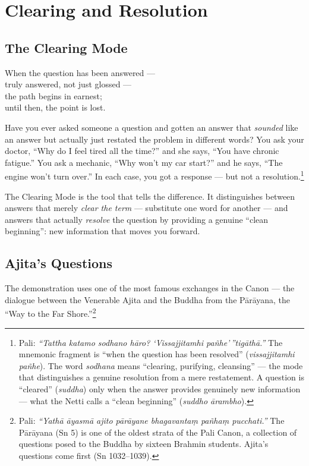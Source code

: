 \chapter{Clearing and Resolution}
\label{ch:clearing}

\section*{The Clearing Mode}

\begin{versebox}
When the question has been answered ---\\
truly answered, not just glossed ---\\
the path begins in earnest;\\
until then, the point is lost.
\end{versebox}

\noindent Have you ever asked someone a question and gotten an answer that \textit{sounded} like an answer but actually just restated the problem in different words? You ask your doctor, ``Why do I feel tired all the time?'' and she says, ``You have chronic fatigue.'' You ask a mechanic, ``Why won't my car start?'' and he says, ``The engine won't turn over.'' In each case, you got a response --- but not a resolution.\footnote{Pali: \textit{``Tattha katamo sodhano hāro? `Vissajjitamhi pañhe'\,''tigāthā.''} The mnemonic fragment is ``when the question has been resolved'' (\textit{vissajjitamhi pañhe}). The word \textit{sodhana} means ``clearing, purifying, cleansing'' --- the mode that distinguishes a genuine resolution from a mere restatement. A question is ``cleared'' (\textit{suddha}) only when the answer provides genuinely new information --- what the Netti calls a ``clean beginning'' (\textit{suddho ārambho}).}

The Clearing Mode is the tool that tells the difference. It distinguishes between answers that merely \textit{clear the term} --- substitute one word for another --- and answers that actually \textit{resolve} the question by providing a genuine ``clean beginning'': new information that moves you forward.

\section*{Ajita's Questions}

The demonstration uses one of the most famous exchanges in the Canon --- the dialogue between the Venerable Ajita and the Buddha from the Pārāyana, the ``Way to the Far Shore.''\footnote{Pali: \textit{``Yathā āyasmā ajito pārāyane bhagavantaṃ pañhaṃ pucchati.''} The Pārāyana (Sn 5) is one of the oldest strata of the Pali Canon, a collection of questions posed to the Buddha by sixteen Brahmin students. Ajita's questions come first (Sn 1032--1039).}

